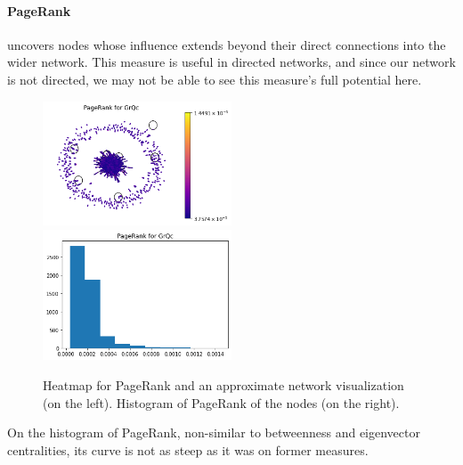 \documentclass[letterpaper, 11pt]{article}
\newcommand{\1}{\mathds{1}}	%
\theoremstyle{definition}
\begin{document}
\paragraph{PageRank}uncovers nodes whose influence extends beyond their direct connections into the wider network. This measure is useful in directed networks, and since our network is not directed, we may not be able to see this measure's full potential here. 
\begin{figure}[h]
\includegraphics[width=0.5\textwidth]{GrQc_pr.png}
\includegraphics[width=0.5\textwidth]{GrQc_pr_hist.png}
\captionsetup{justification=centering,margin=0.5cm}
\caption{Heatmap for PageRank and an approximate network visualization (on the left). Histogram of PageRank of the nodes (on the right).}
\label{fig:pr}
\end{figure}
On the histogram of PageRank, non-similar to betweenness and eigenvector centralities, its curve is not as steep as it was on former measures. 
\end{document}
